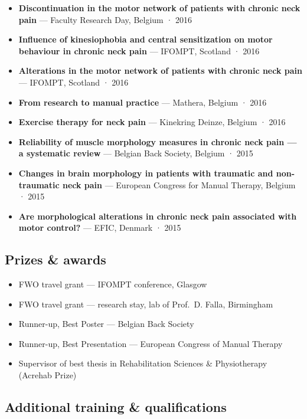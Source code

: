 \documentclass[
  letterpaper,
  DIV=11,
  numbers=noendperiod]{scrartcl}
\providecommand{\tightlist}{%
  \setlength{\itemsep}{0pt}\setlength{\parskip}{0pt}}\usepackage{longtable,booktabs,array}
\begin{document}
\begin{itemize}
{  chronic neck pain} --- IFOMPT, Scotland · 2016
\item
  \textbf{Discontinuation in the motor network of patients with chronic
  neck pain} --- Faculty Research Day, Belgium · 2016
\item
  \textbf{Influence of kinesiophobia and central sensitization on motor
  behaviour in chronic neck pain} --- IFOMPT, Scotland · 2016
\item
  \textbf{Alterations in the motor network of patients with chronic neck
  pain} --- IFOMPT, Scotland · 2016
\item
  \textbf{From research to manual practice} --- Mathera, Belgium · 2016
\item
  \textbf{Exercise therapy for neck pain} --- Kinekring Deinze, Belgium
  · 2016
\item
  \textbf{Reliability of muscle morphology measures in chronic neck pain
  --- a systematic review} --- Belgian Back Society, Belgium · 2015
\item
  \textbf{Changes in brain morphology in patients with traumatic and
  non-traumatic neck pain} --- European Congress for Manual Therapy,
  Belgium · 2015
\item
  \textbf{Are morphological alterations in chronic neck pain associated
  with motor control?} --- EFIC, Denmark · 2015
\end{itemize}

\subsection{Prizes \& awards}\label{awards}

\begin{itemize}
\tightlist
\item
  FWO travel grant --- IFOMPT conference, Glasgow
\item
  FWO travel grant --- research stay, lab of Prof.~D. Falla, Birmingham
\item
  Runner-up, Best Poster --- Belgian Back Society
\item
  Runner-up, Best Presentation --- European Congress of Manual Therapy
\item
  Supervisor of best thesis in Rehabilitation Sciences \& Physiotherapy
  (Acrehab Prize)
\end{itemize}

\subsection{Additional training \& qualifications}\label{training}
\end{document}
